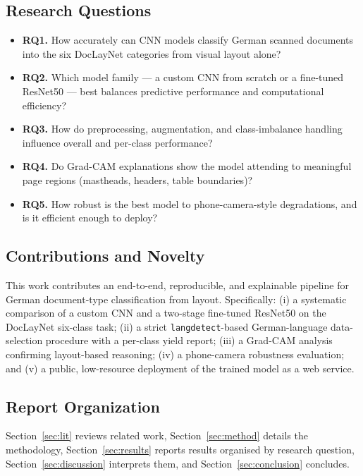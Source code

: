 \documentclass[preprint,12pt]{elsarticle}
\begin{document}
\subsection{Research Questions}
\begin{itemize}
    \item \textbf{RQ1.} How accurately can CNN models classify German scanned documents into the six DocLayNet categories from visual layout alone?
    \item \textbf{RQ2.} Which model family --- a custom CNN from scratch or a fine-tuned ResNet50 --- best balances predictive performance and computational efficiency?
    \item \textbf{RQ3.} How do preprocessing, augmentation, and class-imbalance handling influence overall and per-class performance?
    \item \textbf{RQ4.} Do Grad-CAM explanations show the model attending to meaningful page regions (mastheads, headers, table boundaries)?
    \item \textbf{RQ5.} How robust is the best model to phone-camera-style degradations, and is it efficient enough to deploy?
\end{itemize}

\subsection{Contributions and Novelty}
This work contributes an end-to-end, reproducible, and explainable pipeline for
German document-type classification from layout.
Specifically: (i) a systematic comparison of a custom CNN and a two-stage
fine-tuned ResNet50 on the DocLayNet six-class task; (ii) a strict
\texttt{langdetect}-based German-language data-selection procedure with a
per-class yield report; (iii) a Grad-CAM analysis confirming layout-based
reasoning; (iv) a phone-camera robustness evaluation; and (v) a public,
low-resource deployment of the trained model as a web service.

\subsection{Report Organization}
Section~\ref{sec:lit} reviews related work, Section~\ref{sec:method} details the
methodology, Section~\ref{sec:results} reports results organised by research
question, Section~\ref{sec:discussion} interprets them, and
Section~\ref{sec:conclusion} concludes.

\end{document}
